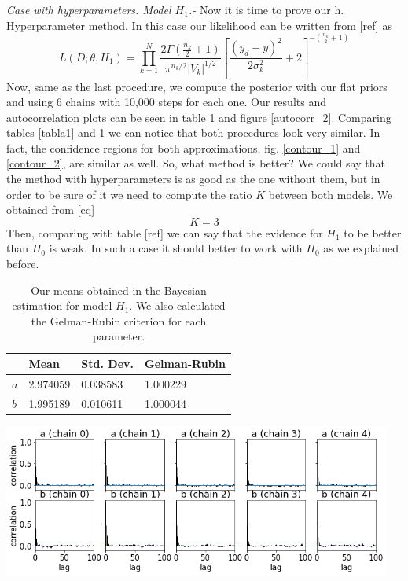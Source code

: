 \documentclass[onecolumn,           %
               showpacs,            %
               preprintnumbers,     %
               aps,                 %
               prl,          	    %
               letterpaper,             %
               superscriptaddress,      %
               nofootinbib,         %
               tightenlines,        %
               floats,floatfix      %
               ,usenatbib,
               ]{revtex4-1}
\begin{document}
\textit{Case with hyperparameters. Model $H_1$.-} Now it is time to prove our h. Hyperparameter method. In this case our likelihood can be written from [ref] as
\begin{equation}
L(D;\theta,H_1)=\prod_{k=1}^N\frac{2\Gamma(\frac{n_k}{2}+1)}{\pi^{n_k/2}|V_k|^{1/2}}\left[\frac{(y_d-y)^2}{2\sigma_k^2}+2\right]^{-\left(\frac{n_k}{2}+1\right)}
\end{equation}
Now, same as the last procedure, we compute the posterior with our flat priors and using 6 chains with 10,000 steps for each one. Our results and autocorrelation plots can be seen in table \ref{tab} and figure \ref{autocorr_2}. Comparing tables \ref{tabla1} and \ref{tab} we can notice that both procedures look very similar. In fact, the confidence regions for both approximations, fig. \ref{contour_1} and \ref{contour_2}, are similar as well. So, what method is better? We could say that the method with hyperparameters is as good as the one without them, but in order to be sure of it we need to compute the ratio $K$ between both models. We obtained from [eq] 
\begin{equation}
K = 3
\end{equation}
Then, comparing with table [ref] we can say that the evidence for $H_1$ to be better than $H_0$ is weak. In such a case it should better to work with $H_0$ as we explained before.

\begin{table}[h!]
\centering
\begin{tabular}{||l|l|l|l||} 
 \hline
 & \textbf{Mean} & \textbf{Std. Dev.} & \textbf{Gelman-Rubin} \\ [0.5ex] 
 \hline\hline
$a$ & 2.974059 	 & 0.038583 & 1.000229 \\
\hline
$b$ & 1.995189 & 0.010611 	 & 1.000044\\ [1ex] 
 \hline
\end{tabular}
\caption{\footnotesize{Our means obtained in the Bayesian estimation for model $H_1$. We also calculated the Gelman-Rubin criterion for each parameter.}}
\label{tab}
\end{table}

\begin{minipage}{\textwidth}
\centering
\includegraphics[height=5cm]{Figures/autocorr_2.png}
\label{autocorr_2}
\end{minipage}
\\$ $
\end{document}
